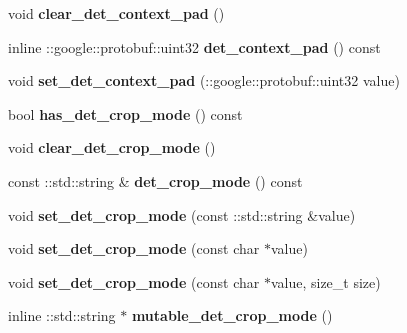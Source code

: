\begin{DoxyCompactItemize}
void {\bfseries clear\+\_\+det\+\_\+context\+\_\+pad} ()
\item 
\mbox{\label{classcaffe_1_1_v0_layer_parameter_a405c7e1e31c542d35e5c334668ef82f9}} 
inline \+::google\+::protobuf\+::uint32 {\bfseries det\+\_\+context\+\_\+pad} () const
\item 
\mbox{\label{classcaffe_1_1_v0_layer_parameter_ae96003a58cd160265992e56ebc549ba9}} 
void {\bfseries set\+\_\+det\+\_\+context\+\_\+pad} (\+::google\+::protobuf\+::uint32 value)
\item 
\mbox{\label{classcaffe_1_1_v0_layer_parameter_a8f96a4b447c223edb3614e552c073d81}} 
bool {\bfseries has\+\_\+det\+\_\+crop\+\_\+mode} () const
\item 
\mbox{\label{classcaffe_1_1_v0_layer_parameter_ae59db00c2283364d4a06716d7c7df32b}} 
void {\bfseries clear\+\_\+det\+\_\+crop\+\_\+mode} ()
\item 
\mbox{\label{classcaffe_1_1_v0_layer_parameter_a71475a86843e88a5bf62babf2f5be495}} 
const \+::std\+::string \& {\bfseries det\+\_\+crop\+\_\+mode} () const
\item 
\mbox{\label{classcaffe_1_1_v0_layer_parameter_a6298bb586a4f2a2154a9430537b3747c}} 
void {\bfseries set\+\_\+det\+\_\+crop\+\_\+mode} (const \+::std\+::string \&value)
\item 
\mbox{\label{classcaffe_1_1_v0_layer_parameter_a5a4c4d39382dfa9835d6f970b1ee1736}} 
void {\bfseries set\+\_\+det\+\_\+crop\+\_\+mode} (const char $\ast$value)
\item 
\mbox{\label{classcaffe_1_1_v0_layer_parameter_a554a184003803ca5021e3eff47579abe}} 
void {\bfseries set\+\_\+det\+\_\+crop\+\_\+mode} (const char $\ast$value, size\+\_\+t size)
\item 
\mbox{\label{classcaffe_1_1_v0_layer_parameter_a4d8d23382a8a9eff378a790d822c0341}} 
inline \+::std\+::string $\ast$ {\bfseries mutable\+\_\+det\+\_\+crop\+\_\+mode} ()

\end{DoxyCompactItemize}
